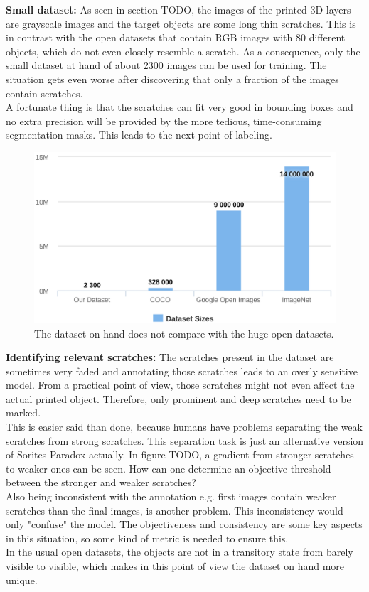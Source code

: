 \textbf{Small dataset:}
As seen in section TODO, the images of the printed 3D layers are grayscale images and the target objects are some long thin scratches. This is in contrast with the open datasets that contain RGB images with 80 different objects, which do not even closely resemble a scratch. As a consequence, only the small dataset at hand of about 2300 images can be used for training. The situation gets even worse after discovering that only a fraction of the images contain scratches. \\
A fortunate thing is that the scratches can fit very good in bounding boxes and no extra precision will be provided by the more tedious, time-consuming segmentation masks. This leads to the next point of labeling. \\

\begin{figure}[!h]
\centering
\includegraphics[width=0.65\columnwidth]{images/introduction/dataset_sizes}
\caption{The dataset on hand does not compare with the huge open datasets.}
\label{intro:dataset_sizes}
\end{figure}

\textbf{Identifying relevant scratches:}
The scratches present in the dataset are sometimes very faded and annotating those scratches leads to an overly sensitive model. From a practical point of view, those scratches might not even affect the actual printed object. Therefore, only prominent and deep scratches need to be marked. \\
This is easier said than done, because humans have problems separating the weak scratches from strong scratches. This separation task is just an alternative version of Sorites Paradox actually. In figure TODO, a gradient from stronger scratches to weaker ones can be seen. How can one determine an objective threshold between the stronger and weaker scratches? \\
Also being inconsistent with the annotation e.g. first images contain weaker scratches than the final images, is another problem. This inconsistency would only "confuse" the model.
The objectiveness and consistency are some key aspects in this situation, so some kind of metric is needed to ensure this.\\
In the usual open datasets, the objects are not in a transitory state from barely visible to visible, which makes in this point of view the dataset on hand more unique. \\

